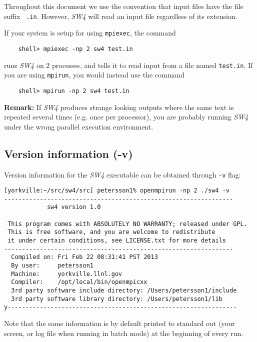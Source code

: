 \documentclass[11pt]{report}
\begin{document}
Throughout this document we use the convention that input files have the file suffix {\tt
  .in}. However, \emph{SW4} will read an input file regardless of its extension.

If your system is setup for using \verb+mpiexec+, the command
\begin{verbatim}
	shell> mpiexec -np 2 sw4 test.in
\end{verbatim}
runs \emph{SW4} on 2 processes, and tells it to read input from a file named {\tt test.in}.  If you
are using \verb+mpirun+, you would instead use the command
\begin{verbatim}
	shell> mpirun -np 2 sw4 test.in
\end{verbatim}
{\bf Remark: }
If \emph{SW4} produces strange looking outputs where the same text is repeated several times (e.g. once
per processor), you are probably running \emph{SW4} under the wrong parallel execution environment.
%

\subsection{Version information (-v)}

Version information for the \emph{SW4} executable can be obtained through {\tt -v} flag:
\begin{verbatim}
[yorkville:~/src/sw4/src] petersson1% openmpirun -np 2 ./sw4 -v
----------------------------------------------------------------
            sw4 version 1.0

 This program comes with ABSOLUTELY NO WARRANTY; released under GPL.
 This is free software, and you are welcome to redistribute     
 it under certain conditions, see LICENSE.txt for more details  
----------------------------------------------------------------
  Compiled on: Fri Feb 22 08:31:41 PST 2013
  By user:     petersson1
  Machine:     yorkville.llnl.gov
  Compiler:    /opt/local/bin/openmpicxx
  3rd party software include directory: /Users/petersson1/include
  3rd party software library directory: /Users/petersson1/lib
y----------------------------------------------------------------
\end{verbatim}
Note that the same information is by default printed to standard out (your screen, or log file when
running in batch mode) at the beginning of every run.
\end{document}
